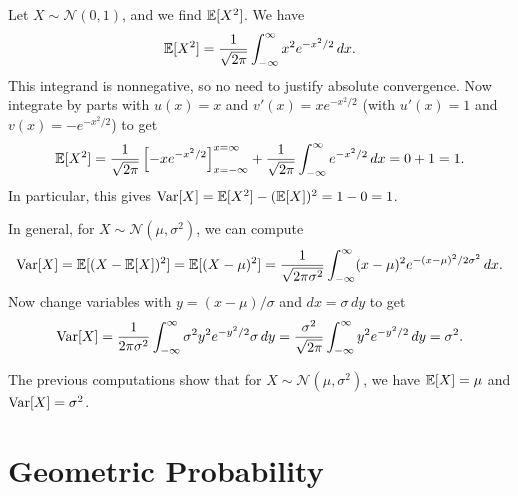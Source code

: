 \begin{example}
  Let $X \sim \mathcal{N}(0, 1)$, and we find
  $\mathbb{E}[X^2]$. We have
  \[
    \mathbb{E}[X^2] = \frac{1}{\sqrt{2\pi}} \int_{-\infty}^\infty x^2 e^{-x^2 / 2} \, dx.
  \]
  This integrand is nonnegative, so no need to justify
  absolute convergence. Now integrate by parts
  with $u(x) = x$ and $v'(x) = x e^{-x^2 / 2}$ (with
  $u'(x) = 1$ and $v(x) = -e^{-x^2 / 2}$) to get
  \[
    \mathbb{E}[X^2] = \frac{1}{\sqrt{2\pi}} \left[ -x e^{-x^2 / 2} \right]_{x = -\infty}^{x = \infty} + \frac{1}{\sqrt{2\pi}} \int_{-\infty}^\infty e^{-x^2 / 2} \, dx = 0 + 1 = 1.
  \]
  In particular, this gives
  $\operatorname{Var}[X] = \mathbb{E}[X^2] - (\mathbb{E}[X])^2 = 1 - 0 = 1$.
\end{example}

\begin{example}
  In general, for $X \sim \mathcal{N}(\mu, \sigma^2)$,
  we can compute
  \[
    \operatorname{Var}[X] = \mathbb{E}[(X - \mathbb{E}[X])^2]
    = \mathbb{E}[(X - \mu)^2]
    = \frac{1}{\sqrt{2\pi \sigma^2}}
    \int_{-\infty}^\infty (x - \mu)^2 e^{-(x - \mu)^2 / 2\sigma^2}\, dx.
  \]
  Now change variables with
  $y = (x - \mu) / \sigma$ and $dx = \sigma\, dy$ to get
  \[
    \operatorname{Var}[X] = \frac{1}{2\pi \sigma^2} \int_{-\infty}^\infty \sigma^2 y^2 e^{-y^2 / 2} \sigma\, dy
    = \frac{\sigma^2}{\sqrt{2\pi}} \int_{-\infty}^\infty y^2 e^{-y^2 / 2} \, dy
    = \sigma^2.
  \]
\end{example}

\begin{remark}
  The previous computations show that
  for $X \sim \mathcal{N}(\mu, \sigma^2)$, we have
  $\mathbb{E}[X] = \mu$ and $\operatorname{Var}[X] = \sigma^2$.
\end{remark}

\section{Geometric Probability}

